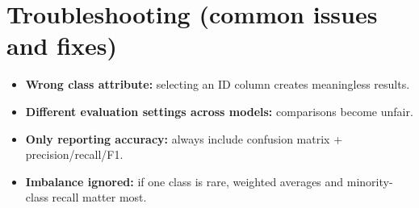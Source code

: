 \documentclass[11pt]{article}
\begin{document}
\section{Troubleshooting (common issues and fixes)}
\begin{itemize}[leftmargin=*]
  \item \textbf{Wrong class attribute:} selecting an ID column creates meaningless results.
  \item \textbf{Different evaluation settings across models:} comparisons become unfair.
  \item \textbf{Only reporting accuracy:} always include confusion matrix + precision/recall/F1.
  \item \textbf{Imbalance ignored:} if one class is rare, weighted averages and minority-class recall matter most.
\end{itemize}

\notesources{\AIMLLabSources}
\end{document}
